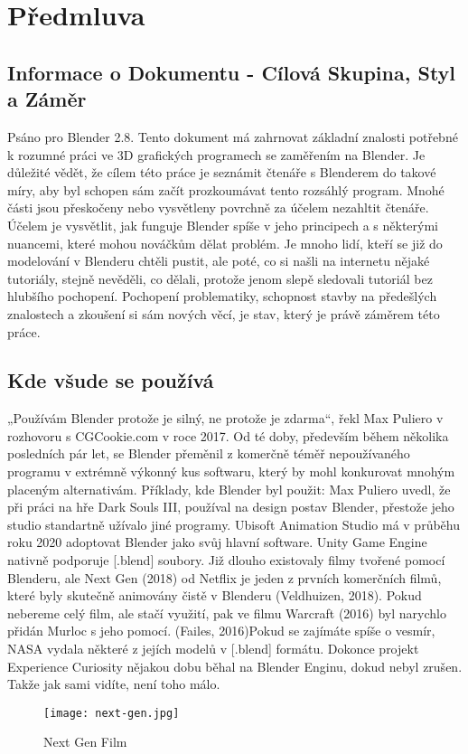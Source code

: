 \documentclass[12pt,a4paper]{report}
\begin{document}
	\pagebreak
	\tableofcontents
	\pagebreak
	
	\chapter{Předmluva}
	\section{Informace o Dokumentu - Cílová Skupina, Styl a Záměr}
	Psáno pro Blender 2.8. Tento dokument má zahrnovat základní znalosti
	potřebné k rozumné práci ve 3D grafických programech se zaměřením na
	Blender.
	Je důležité vědět, že cílem této práce je seznámit čtenáře s Blenderem do
	takové míry, aby byl schopen sám začít prozkoumávat tento rozsáhlý
	program. Mnohé části jsou přeskočeny nebo vysvětleny povrchně za
	účelem nezahltit čtenáře.
	Účelem je vysvětlit, jak funguje Blender spíše v jeho principech a s
	některými nuancemi, které mohou nováčkům dělat problém. Je mnoho
	lidí, kteří se již do modelování v Blenderu chtěli pustit, ale poté, co si našli
	na internetu nějaké tutoriály, stejně nevěděli, co dělali, protože jenom
	slepě sledovali tutoriál bez hlubšího pochopení. Pochopení problematiky,
	schopnost stavby na předešlých znalostech a zkoušení si sám nových
	věcí, je stav, který je právě záměrem této práce.
	\section{Kde všude se používá}
	„Používám Blender protože je silný, ne protože je zdarma“, řekl Max
	Puliero v rozhovoru s CGCookie.com v roce 2017. \cite{cgcookiePuliero} Od té
	doby, především během několika posledních pár let, se Blender přeměnil
	z komerčně téměř nepoužívaného programu v extrémně výkonný kus
	softwaru, který by mohl konkurovat mnohým placeným alternativám.
	Příklady, kde Blender byl použit:
	Max Puliero uvedl, že při práci na hře Dark Souls III, používal na design
	postav Blender, přestože jeho studio standartně užívalo jiné programy.
	\cite{cgcookiePuliero} Ubisoft Animation Studio má v průběhu roku 2020
	adoptovat Blender jako svůj hlavní software. \cite{ubisoft-news-BlenderDevFund} Unity Game
	Engine nativně podporuje [.blend] soubory.
	Již dlouho existovaly filmy tvořené pomocí Blenderu, ale Next Gen (2018)
	od Netflix je jeden z prvních komerčních filmů, které byly skutečně
	animovány čistě v Blenderu (Veldhuizen, 2018). Pokud nebereme celý
	film, ale stačí využití, pak ve filmu Warcraft (2016) byl narychlo přidán
	Murloc s jeho pomocí. (Failes, 2016)Pokud se zajímáte spíše o vesmír, NASA vydala některé z jejích modelů
	v [.blend] formátu. Dokonce projekt Experience Curiosity nějakou dobu
	běhal na Blender Enginu, dokud nebyl zrušen.
	Takže jak sami vidíte, není toho málo.
	\begin{figure}
		\centering
		\texttt{[image: next-gen.jpg]}
		\caption{Next Gen Film \cite{netflix-nextgen}}
		\label{pic:netflix-nextgen}
	\end{figure}
	
\end{document}
